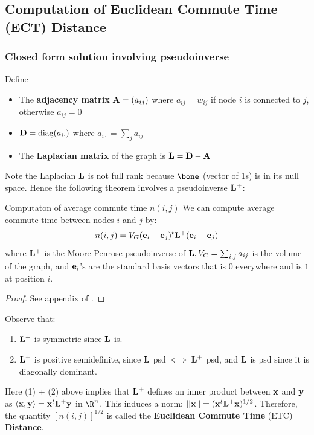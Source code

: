 \documentclass[./some_latex_template.tex]{subfiles}
\begin{document}
\subsection{Computation of Euclidean Commute Time (ECT) Distance}

\subsubsection{Closed form solution involving pseudoinverse}

Define 
\begin{itemize}
	\item The \textbf{adjacency matrix} $\mathbf{A} = (a_{ij})$ where $a_{ij} = w_{ij}$ if node $i$ is connected to $j$, otherwise $a_{ij} = 0$
	\item $\mathbf{D} = \text{diag}(a_{i\cdot})$  where $a_{i\cdot} = \sum_{j}a_{ij}$
	\item The \textbf{Laplacian matrix} of the graph is $\mathbf{L} = \mathbf{D} - \mathbf{A}$
\end{itemize}

\noindent Note the Laplacian $\mathbf{L}$ is not full rank because $\bone$ (vector of 1s) is in its null space. Hence the following theorem involves a pseudoinverse $\mathbf{L}^+$: 

\begin{theorembox}{Computaton of average commute time $n(i, j)$}{}
We can compute average commute time between nodes $i$ and $j$ by:
\begin{align*}
	n(i, j) = V_G (\mathbf{e}_i - \mathbf{e}_j)^t\mathbf{L}^+(\mathbf{e}_i - \mathbf{e}_j)
\end{align*}
where $\mathbf{L}^+$ is the Moore-Penrose pseudoinverse of $\mathbf{L}, V_G = \sum_{i,j} a_{ij}$ is the volume of the graph, and $\mathbf{e}_i$'s are the standard basis vectors that is $0$ everywhere and is $1$ at position $i$. 
\end{theorembox}
\begin{proof}
See appendix of \cite{fouss2007random}. 
\end{proof}

\noindent Observe that:
\begin{enumerate}
	\item $\mathbf{L}^+$ is symmetric since $\mathbf{L}$ is. 
	\item $\mathbf{L}^+$ is positive semidefinite, since $\mathbf{L}$ psd $\iff \mathbf{L}^+$ psd, and $\mathbf{L}$ is psd since it is diagonally dominant. 
\end{enumerate}

\noindent Here (1) + (2) above implies that $\mathbf{L}^+$ defines an inner product between $\mathbf{x}$ and $\mathbf{y}$ as $\langle\mathbf{x}, \mathbf{y}\rangle = \mathbf{x}^t\mathbf{L}^+\mathbf{y}$ in $\R^n$. This induces a norm: $||\mathbf{x}|| = (\mathbf{x}^t\mathbf{L}^+\mathbf{x})^{1/2}$. Therefore, the quantity $[n(i, j)]^{1/2}$ is called the \textbf{Euclidean Commute Time} (ETC) \textbf{Distance}. 
\end{document}
